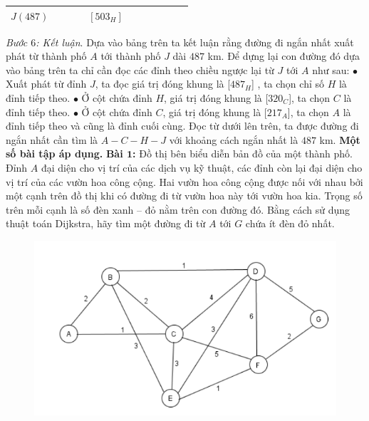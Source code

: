 \begin{multicols}{2}
\begin{table}[H]
{\begin{tabular}{|c|c|c|c|c|c|c|c|c|c|c|}
			\hline
			$J(487)$&	&	&	&$[503_H]$&	& & & & & \\
			\hline
		\end{tabular}}
		\vspace*{-10pt}
	\end{table} 		
	\textit{Bước $6$: Kết luận}. Dựa vào bảng trên ta kết luận rằng đường đi ngắn nhất xuất phát từ thành phố $A$ tới thành phố $J$ dài $487$ km. Để dựng lại con đường đó dựa vào bảng trên ta chỉ cần đọc các đỉnh theo chiều ngược lại từ $J$ tới $A$ như sau:
	\vskip 0.1cm
	$\bullet$ Xuất phát từ đỉnh $J$, ta đọc giá trị đóng khung là [$487_H$] , ta chọn chỉ số $H$ là đỉnh tiếp theo.
	\vskip 0.1cm
	$\bullet$ Ở cột chứa đỉnh $H$, giá trị đóng khung là [$320_C$], ta chọn $C$ là đỉnh tiếp theo.
	\vskip 0.1cm
	$\bullet$ Ở cột chứa đỉnh $C$, giá trị đóng khung là [$217_A$], ta chọn $A$ là đỉnh tiếp theo và cũng là đỉnh cuối cùng. 
	\vskip 0.1cm
	Đọc từ dưới lên trên, ta được đường đi ngắn nhất cần tìm là $A-C-H-J$ với khoảng cách ngắn nhất là $487$ km.
	\vskip 0.1cm 
\textbf{\color{quantoan}Một số bài tập áp dụng.}
	\vskip 0.1cm 
	\textbf{\color{quantoan}Bài $\pmb{1}$:} Đồ thị bên biểu diễn bản đồ của một thành phố. Đỉnh $A$ đại diện cho vị trí của các dịch vụ kỹ thuật, các đỉnh còn lại đại diện cho vị trí của các vườn hoa công cộng. Hai vườn hoa công cộng được nối với nhau bởi một cạnh trên đồ thị khi có đường đi từ vườn hoa này tới vườn hoa kia. Trọng số trên mỗi cạnh là số đèn xanh -- đỏ nằm trên con đường đó. Bằng cách sử dụng thuật toán Dijkstra, hãy tìm một đường đi từ $A$ tới $G$ chứa ít đèn đỏ nhất. 	 
	\begin{figure}[H]
		\vspace*{-5pt}
		\centering
		\captionsetup{labelformat= empty, justification=centering}
		\includegraphics[width= 1\linewidth]{4}
		\vspace*{-10pt}

\end{figure}
\end{multicols}
